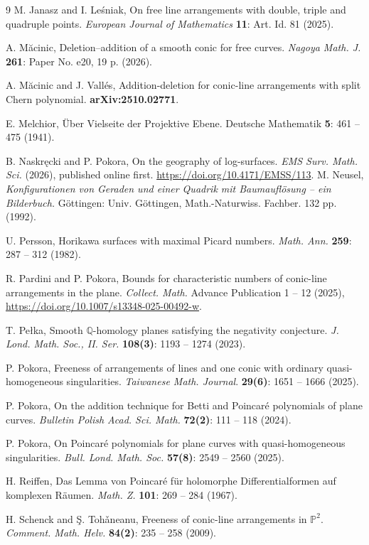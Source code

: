 \documentclass[11pt]{article}
\theoremstyle{plain}
\theoremstyle{definition}
\theoremstyle{remark}
\begin{document}
\begin{thebibliography}{9}
M. Janasz and I. Le\'sniak, On free line arrangements with double, triple and quadruple points. \textit{European Journal of Mathematics} \textbf{11}: Art. Id. 81 (2025).

A. M\u{a}cinic, Deletion--addition of a smooth conic for free curves. \textit{Nagoya Math. J.} \textbf{261}: Paper No. e20, 19 p. (2026).

A. M\u{a}cinic and J. Vall\'es, Addition-deletion for conic-line arrangements with split Chern polynomial. \textbf{arXiv:2510.02771}.

E. Melchior, \"{U}ber Vielseite der Projektive Ebene. Deutsche Mathematik {\bf 5}: 461 – 475 (1941).

B. Naskręcki and P. Pokora, On the geography of log-surfaces. \textit{EMS Surv. Math. Sci.} (2026), published online first. \url{ https://doi.org/10.4171/EMSS/113}.
M. Neusel, \textit{Konfigurationen von Geraden und einer Quadrik mit Baumaufl\"osung – ein Bilderbuch.} G\"ottingen: Univ. G\"ottingen, Math.-Naturwiss. Fachber. 132 pp. (1992).


U. Persson, Horikawa surfaces with maximal Picard numbers. \textit{Math. Ann.} \textbf{259}: 287 -- 312 (1982).

R. Pardini and P. Pokora, Bounds for characteristic numbers of conic-line arrangements in the plane. \textit{Collect. Math.} Advance Publication 1 -- 12 (2025), \url{https://doi.org/10.1007/s13348-025-00492-w}.

T. Pe\l ka, Smooth $\mathbb{Q}$-homology planes satisfying the negativity conjecture. \textit{J. Lond. Math. Soc., II. Ser.} \textbf{108(3)}: 1193 -- 1274 (2023).

P. Pokora, Freeness of arrangements of lines and one conic with ordinary quasi-homogeneous singularities. \textit{Taiwanese Math. Journal}. \textbf{29(6)}: 1651 -- 1666 (2025).

P. Pokora, On the addition technique for Betti and Poincar\'e polynomials of plane curves. \textit{Bulletin Polish Acad. Sci. Math.} \textbf{72(2)}: 111 -- 118 (2024).

P. Pokora, On Poincar\'e polynomials for plane curves with quasi-homogeneous singularities. \textit{Bull. Lond. Math. Soc.} \textbf{57(8)}: 2549 -- 2560 (2025).

H. Reiffen, Das Lemma von Poincar\'e f\"ur holomorphe Differentialformen auf komplexen R\"aumen. \textit{Math. Z.} \textbf{101}:  269 -- 284 (1967). 

H. Schenck and \c{S}. Toh\v{a}neanu, Freeness of conic-line arrangements in $\mathbb{P}^{2}$. \textit{Comment. Math. Helv.} \textbf{84(2)}: 235 -- 258 (2009).

\end{thebibliography}
\end{document}
